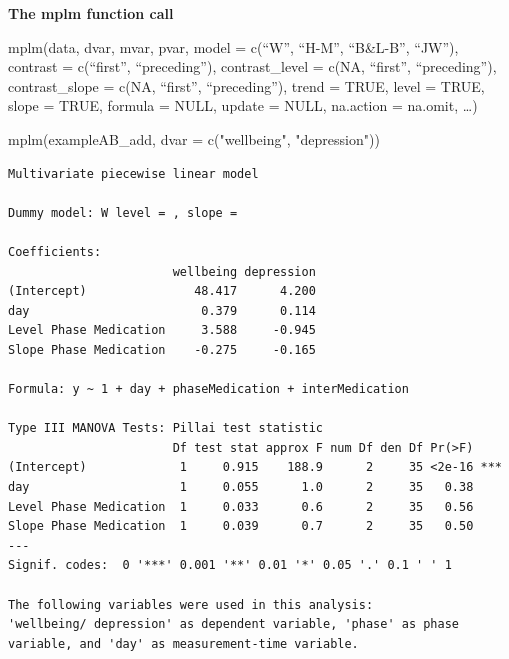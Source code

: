 \documentclass[
  letterpaper,
  DIV=11,
  numbers=noendperiod]{scrreprt}
\newenvironment{Shaded}{\begin{snugshade}}{\end{snugshade}}
\newcommand{\AttributeTok}[1]{\textcolor[rgb]{0.40,0.45,0.13}{#1}}
\newcommand{\FunctionTok}[1]{\textcolor[rgb]{0.28,0.35,0.67}{#1}}
\newcommand{\NormalTok}[1]{\textcolor[rgb]{0.00,0.23,0.31}{#1}}
\newcommand{\StringTok}[1]{\textcolor[rgb]{0.13,0.47,0.30}{#1}}
\begin{document}
\begin{tcolorbox}[enhanced jigsaw, breakable, rightrule=.15mm, bottomrule=.15mm, arc=.35mm, colback=white, colframe=quarto-callout-tip-color-frame, opacityback=0, leftrule=.75mm, toprule=.15mm, left=2mm]
\begin{minipage}[t]{5.5mm}
\textcolor{quarto-callout-tip-color}{\faLightbulb}
\end{minipage}%
\begin{minipage}[t]{\textwidth - 5.5mm}

\textbf{The mplm function call}\vspace{2mm}

mplm(data, dvar, mvar, pvar, model = c(``W'', ``H-M'', ``B\&L-B'',
``JW''), contrast = c(``first'', ``preceding''), contrast\_level = c(NA,
``first'', ``preceding''), contrast\_slope = c(NA, ``first'',
``preceding''), trend = TRUE, level = TRUE, slope = TRUE, formula =
NULL, update = NULL, na.action = na.omit, \ldots)

\end{minipage}%
\end{tcolorbox}

\begin{Shaded}
\begin{Highlighting}[]
\FunctionTok{mplm}\NormalTok{(exampleAB\_add, }\AttributeTok{dvar =} \FunctionTok{c}\NormalTok{(}\StringTok{"wellbeing"}\NormalTok{, }\StringTok{"depression"}\NormalTok{))}
\end{Highlighting}
\end{Shaded}

\begin{verbatim}
Multivariate piecewise linear model

Dummy model: W level = , slope = 

Coefficients: 
                       wellbeing depression
(Intercept)               48.417      4.200
day                        0.379      0.114
Level Phase Medication     3.588     -0.945
Slope Phase Medication    -0.275     -0.165

Formula: y ~ 1 + day + phaseMedication + interMedication

Type III MANOVA Tests: Pillai test statistic
                       Df test stat approx F num Df den Df Pr(>F)    
(Intercept)             1     0.915    188.9      2     35 <2e-16 ***
day                     1     0.055      1.0      2     35   0.38    
Level Phase Medication  1     0.033      0.6      2     35   0.56    
Slope Phase Medication  1     0.039      0.7      2     35   0.50    
---
Signif. codes:  0 '***' 0.001 '**' 0.01 '*' 0.05 '.' 0.1 ' ' 1

The following variables were used in this analysis:
'wellbeing/ depression' as dependent variable, 'phase' as phase variable, and 'day' as measurement-time variable.
\end{verbatim}
\end{document}
